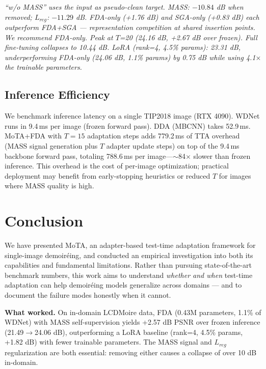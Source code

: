 \documentclass[review,10pt]{elsarticle}
\begin{document}
{\raggedright\footnotesize\textit{``w/o MASS'' uses the input as pseudo-clean target. MASS: $-10.84$ dB when removed; $L_{reg}$: $-11.29$ dB. FDA-only (+1.76 dB) and SGA-only (+0.83 dB) each outperform FDA+SGA — representation competition at shared insertion points. We recommend FDA-only. Peak at $T$=20 (24.16 dB, +2.67 dB over frozen). Full fine-tuning collapses to 10.44 dB. LoRA (rank=4, 4.5\% params): 23.31 dB, underperforming FDA-only (24.06 dB, 1.1\% params) by 0.75 dB while using 4.1$\times$ the trainable parameters.}}

\subsection{Inference Efficiency}

We benchmark inference latency on a single TIP2018 image (RTX 4090). WDNet runs in 9.4\,ms per image (frozen forward pass). DDA (MBCNN) takes 52.9\,ms. MoTA+FDA with $T{=}15$ adaptation steps adds 779.2\,ms of TTA overhead (MASS signal generation plus $T$ adapter update steps) on top of the 9.4\,ms backbone forward pass, totaling 788.6\,ms per image---$\sim$84$\times$ slower than frozen inference. This overhead is the cost of per-image optimization; practical deployment may benefit from early-stopping heuristics or reduced $T$ for images where MASS quality is high.

\section{Conclusion}

We have presented MoTA, an adapter-based test-time adaptation framework for single-image demoir\'{e}ing, and conducted an empirical investigation into both its capabilities and fundamental limitations. Rather than pursuing state-of-the-art benchmark numbers, this work aims to understand \textit{whether and when} test-time adaptation can help demoir\'{e}ing models generalize across domains --- and to document the failure modes honestly when it cannot.

\textbf{What worked.} On in-domain LCDMoire data, FDA (0.43M parameters, 1.1\% of WDNet) with MASS self-supervision yields +2.57 dB PSNR over frozen inference (21.49$\to$24.06 dB), outperforming a LoRA baseline (rank=4, 4.5\% params, +1.82 dB) with fewer trainable parameters. The MASS signal and $L_{reg}$ regularization are both essential: removing either causes a collapse of over 10 dB in-domain.
\end{document}
